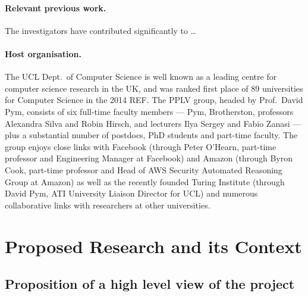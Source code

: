 \documentclass[11pt,twocolumn]{article}
\begin{document}
\paragraph{Relevant previous work.}
The investigators have contributed significantly to \ldots

\paragraph{Host organisation.}
The UCL Dept.\ of Computer Science is well known as a leading centre for computer science research in the UK, and was ranked first place of 89 universities for Computer Science in the 2014 REF. The PPLV group, headed by Prof.\ David Pym, consists of six full-time faculty members --- Pym, Brotherston, professors Alexandra Silva and Robin Hirsch, and lecturers Ilya Sergey and Fabio Zanasi --- plus a substantial number of postdocs, PhD students and part-time faculty. The group enjoys close links with Facebook (through Peter O'Hearn, part-time professor and Engineering Manager at Facebook) and Amazon (through Byron Cook, part-time professor and Head of AWS Security Automated Reasoning Group at Amazon) as well as the recently founded Turing Institute (through David Pym, ATI University Liaison Director for UCL) and numerous collaborative links with researchers at other universities.

\begingroup
\footnotesize
{}
\endgroup


%

\newpage

\section{Proposed Research and its Context}

\subsection{Proposition of a high level view of the project}
\end{document}
